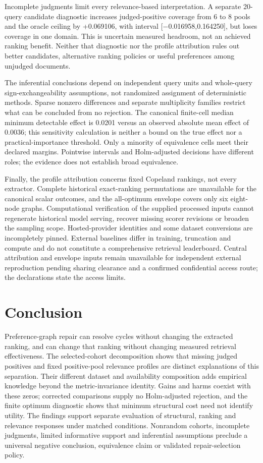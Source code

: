 \documentclass[pdflatex,iicol,sn-basic,Numbered]{sn-jnl}
\begin{document}
Incomplete judgments limit every relevance-based interpretation. A separate 20-query candidate diagnostic increases judged-positive coverage from 6 to 8 pools and the oracle ceiling by +0.069106, with interval [−0.016958,0.164250], but loses coverage in one domain. This is uncertain measured headroom, not an achieved ranking benefit. Neither that diagnostic nor the profile attribution rules out better candidates, alternative ranking policies or useful preferences among unjudged documents.

The inferential conclusions depend on independent query units and whole-query sign-exchangeability assumptions, not randomized assignment of deterministic methods. Sparse nonzero differences and separate multiplicity families restrict what can be concluded from no rejection. The canonical finite-cell median minimum detectable effect is 0.0201 versus an observed absolute mean effect of 0.0036; this sensitivity calculation is neither a bound on the true effect nor a practical-importance threshold. Only a minority of equivalence cells meet their declared margins. Pointwise intervals and Holm-adjusted decisions have different roles; the evidence does not establish broad equivalence.

Finally, the profile attribution concerns fixed Copeland rankings, not every extractor. Complete historical exact-ranking permutations are unavailable for the canonical scalar outcomes, and the all-optimum envelope covers only six eight-node graphs. Computational verification of the supplied processed inputs cannot regenerate historical model serving, recover missing scorer revisions or broaden the sampling scope. Hosted-provider identities and some dataset conversions are incompletely pinned. External baselines differ in training, truncation and compute and do not constitute a comprehensive retrieval leaderboard. Central attribution and envelope inputs remain unavailable for independent external reproduction pending sharing clearance and a confirmed confidential access route; the declarations state the access limits.

\section{Conclusion}\label{sec:conclusion}
Preference-graph repair can resolve cycles without changing the extracted ranking, and can change that ranking without changing measured retrieval effectiveness. The selected-cohort decomposition shows that missing judged positives and fixed positive-pool relevance profiles are distinct explanations of this separation. Their different dataset and availability composition adds empirical knowledge beyond the metric-invariance identity. Gains and harms coexist with these zeros; corrected comparisons supply no Holm-adjusted rejection, and the finite optimum diagnostic shows that minimum structural cost need not identify utility. The findings support separate evaluation of structural, ranking and relevance responses under matched conditions. Nonrandom cohorts, incomplete judgments, limited informative support and inferential assumptions preclude a universal negative conclusion, equivalence claim or validated repair-selection policy.
\end{document}
